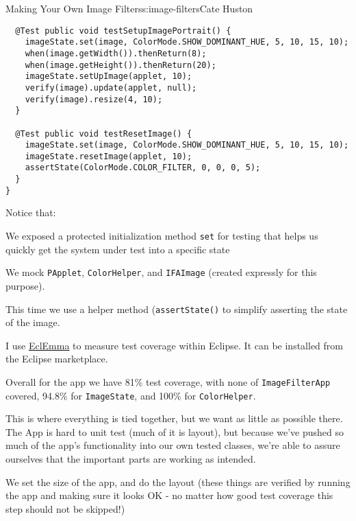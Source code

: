 \begin{aosachapter}{Making Your Own Image Filters}{s:image-filters}{Cate Huston}
\begin{verbatim}
  @Test public void testSetupImagePortrait() {
    imageState.set(image, ColorMode.SHOW_DOMINANT_HUE, 5, 10, 15, 10);
    when(image.getWidth()).thenReturn(8);
    when(image.getHeight()).thenReturn(20);
    imageState.setUpImage(applet, 10);
    verify(image).update(applet, null);
    verify(image).resize(4, 10);
  }

  @Test public void testResetImage() {
    imageState.set(image, ColorMode.SHOW_DOMINANT_HUE, 5, 10, 15, 10);
    imageState.resetImage(applet, 10);
    assertState(ColorMode.COLOR_FILTER, 0, 0, 0, 5);
  }
}
\end{verbatim}

Notice that:

\begin{aosaitemize}

\item
  We exposed a protected initialization method \texttt{set} for testing
  that helps us quickly get the system under test into a specific state
\item
  We mock \texttt{PApplet}, \texttt{ColorHelper}, and \texttt{IFAImage}
  (created expressly for this purpose).
\item
  This time we use a helper method (\texttt{assertState()} to simplify
  asserting the state of the image.
\end{aosaitemize}

\label{measuring-test-coverage}

I use
\href{http://www.eclemma.org/installation.html\#marketplace}{EclEmma} to
measure test coverage within Eclipse. It can be installed from the
Eclipse marketplace.

Overall for the app we have 81\% test coverage, with none of
\texttt{ImageFilterApp} covered, 94.8\% for \texttt{ImageState}, and
100\% for \texttt{ColorHelper}.

\label{imagefilterapp}

This is where everything is tied together, but we want as little as
possible there. The App is hard to unit test (much of it is layout), but
because we've pushed so much of the app's functionality into our own
tested classes, we're able to assure ourselves that the important parts
are working as intended.

We set the size of the app, and do the layout (these things are verified
by running the app and making sure it looks OK - no matter how good test
coverage this step should not be skipped!)


\end{aosachapter}
